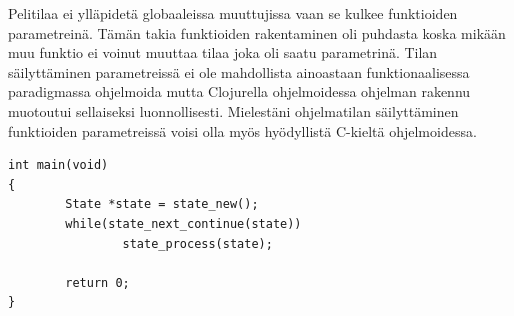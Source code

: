 \documentclass[12pt]{article}
\begin{document}
Pelitilaa ei ylläpidetä globaaleissa muuttujissa vaan se kulkee funktioiden parametreinä.
Tämän takia funktioiden rakentaminen oli puhdasta koska mikään muu funktio ei voinut muuttaa tilaa joka oli saatu parametrinä.
Tilan säilyttäminen parametreissä ei ole mahdollista ainoastaan funktionaalisessa paradigmassa ohjelmoida
mutta Clojurella ohjelmoidessa ohjelman rakennu muotoutui sellaiseksi luonnollisesti.
Mielestäni ohjelmatilan säilyttäminen funktioiden parametreissä voisi olla myös hyödyllistä C-kieltä ohjelmoidessa.

\begin{lstlisting}
int main(void)
{
        State *state = state_new();
        while(state_next_continue(state))
                state_process(state);

        return 0;
}
\end{lstlisting}







\end{document}
